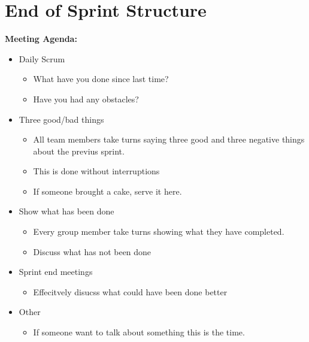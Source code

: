 \chapter{End of Sprint Structure}

\begin{framed}
\textbf{Meeting Agenda: }
\begin{itemize}
    \item Daily Scrum
    \begin{itemize}
        \item What have you done since last time?
        \item Have you had any obstacles? 
    \end{itemize}

    \item Three good/bad things
    \begin{itemize}
        \item All team members take turns saying three good and three negative things
        about the previus sprint. 
        \item This is done without interruptions
        \item If someone brought a cake, serve it here.
    \end{itemize}

    \item Show what has been done
    \begin{itemize}
        \item Every group member take turns showing what they have completed. 
        \item Discuss what has not been done
    \end{itemize}
        
    \item Sprint end meetings
    \begin{itemize}
        \item Effecitvely disucss what could have been done better
    \end{itemize}

    \item Other
    \begin{itemize}
        \item If someone want to talk about something this is the time.
    \end{itemize}


\end{itemize}
\end{framed}
